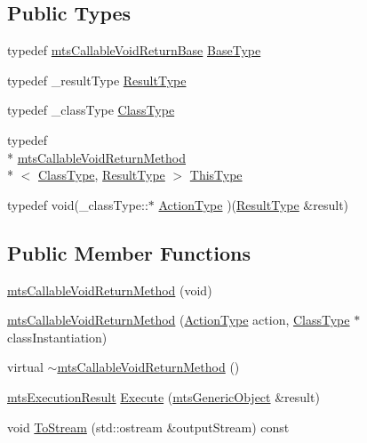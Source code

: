 \subsection*{Public Types}
\begin{DoxyCompactItemize}
\item 
typedef \hyperlink{classmts_callable_void_return_base}{mts\-Callable\-Void\-Return\-Base} \hyperlink{classmts_callable_void_return_method_a01907ccc09041bebecb2085a84f74bb1}{Base\-Type}
\item 
typedef \-\_\-result\-Type \hyperlink{classmts_callable_void_return_method_af01afd5ee66910d12e6fc9703a976260}{Result\-Type}
\item 
typedef \-\_\-class\-Type \hyperlink{classmts_callable_void_return_method_a2bea77e5dd239ec2a1d3558dd3ca1776}{Class\-Type}
\item 
typedef \\*
\hyperlink{classmts_callable_void_return_method}{mts\-Callable\-Void\-Return\-Method}\\*
$<$ \hyperlink{classmts_callable_void_return_method_a2bea77e5dd239ec2a1d3558dd3ca1776}{Class\-Type}, \hyperlink{classmts_callable_void_return_method_af01afd5ee66910d12e6fc9703a976260}{Result\-Type} $>$ \hyperlink{classmts_callable_void_return_method_a03bdd60bba7b2b001dd94270d8a27a5f}{This\-Type}
\item 
typedef void(\-\_\-class\-Type\-::$\ast$ \hyperlink{classmts_callable_void_return_method_a7f1f533b8d1e55b4b35d03dc80017101}{Action\-Type} )(\hyperlink{classmts_callable_void_return_method_af01afd5ee66910d12e6fc9703a976260}{Result\-Type} \&result)
\end{DoxyCompactItemize}
\subsection*{Public Member Functions}
\begin{DoxyCompactItemize}
\item 
\hyperlink{classmts_callable_void_return_method_a98d4891da35626a8e9f924c98c75fa7b}{mts\-Callable\-Void\-Return\-Method} (void)
\item 
\hyperlink{classmts_callable_void_return_method_a2cfed63557476b9bdf5995654ed903b8}{mts\-Callable\-Void\-Return\-Method} (\hyperlink{classmts_callable_void_return_method_a7f1f533b8d1e55b4b35d03dc80017101}{Action\-Type} action, \hyperlink{classmts_callable_void_return_method_a2bea77e5dd239ec2a1d3558dd3ca1776}{Class\-Type} $\ast$class\-Instantiation)
\item 
virtual \hyperlink{classmts_callable_void_return_method_a5ce2600e928bc28ec4c973636307860f}{$\sim$mts\-Callable\-Void\-Return\-Method} ()
\item 
\hyperlink{classmts_execution_result}{mts\-Execution\-Result} \hyperlink{classmts_callable_void_return_method_a815dd28e94497e91cb0ed1e891a35dad}{Execute} (\hyperlink{classmts_generic_object}{mts\-Generic\-Object} \&result)
\item 
void \hyperlink{classmts_callable_void_return_method_a2ca736ce45432c5cd746227795253ea3}{To\-Stream} (std\-::ostream \&output\-Stream) const 
\end{DoxyCompactItemize}
